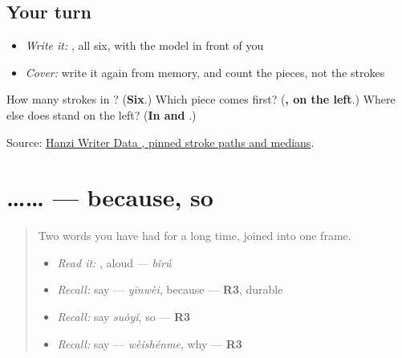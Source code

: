 \subsection*{Your turn}
\begin{itemize}
\raggedright
  \item \emph{Write it:} , all six, with the model in front of you
  \item \emph{Cover:} write it again from memory, and count the pieces, not the strokes
\end{itemize}

\begin{tcolorbox}[breakable,colback=teal!4,colframe=teal!35!black,title={Before you move on}]
How many strokes in ? (\textbf{Six}.) Which piece comes first? (\textbf{, on the left}.) Where else does  stand on the left? (\textbf{In  and }.)

Source: \href{https://raw.githubusercontent.com/chanind/hanzi-writer-data/68d10a4b21150cae5e1ebbd223eed289cf32d90c/data/\%E5\%A6\%82.json}{Hanzi Writer Data , pinned stroke paths and medians}.
\end{tcolorbox}
\section[\texorpdfstring{\zh{因为}…\zh{所以}… (yīnwèi … suǒyǐ …)}{因为…所以… (yīnwèi … suǒyǐ …)}]{…… — because, so}

\label{lesson:ZH-C281-yinwei-suoyi}



\begin{quote}
Two words you have had for a long time, joined into one frame.

\begin{itemize}
\raggedright
  \item \emph{Read it:} , aloud — \emph{bǐrú}
  \item \emph{Recall:} say  — \emph{yīnwèi}, because — \textbf{R3}, durable
  \item \emph{Recall:} say \emph{suǒyǐ}, so — \textbf{R3}
  \item \emph{Recall:} say  — \emph{wèishénme}, why — \textbf{R3}
\end{itemize}
\end{quote}


